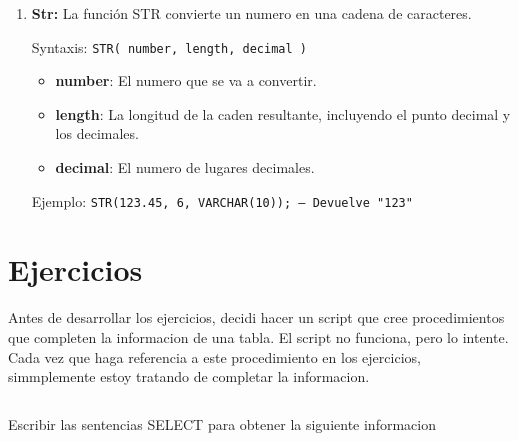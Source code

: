 \documentclass[a4paper,openany,11pt]{article}
\newcommand\skiplines[1]{\vspace{#1\baselineskip}}
\begin{document}
\begin{enumerate}
    \skiplines{1}
    \item \textbf{Str:}
        La función STR convierte un numero en una cadena de caracteres.

        Syntaxis: \texttt{STR( number, length, decimal )}
        \begin{itemize}
            \item \textbf{number}: El numero que se va a convertir.
            \item \textbf{length}: La longitud de la caden resultante,
                incluyendo el punto decimal y los decimales.
            \item \textbf{decimal}: El numero de lugares decimales.
        \end{itemize}

        Ejemplo: \texttt{STR(123.45, 6, VARCHAR(10)); -- Devuelve "123"}
\end{enumerate}

\section[5.2]{Ejercicios}
Antes de desarrollar los ejercicios, decidi hacer un script que cree
procedimientos que completen la informacion de una tabla. El script no
funciona, pero lo intente. Cada vez que haga referencia a este procedimiento en
los ejercicios, simmplemente estoy tratando de completar la informacion.

\inputminted[breaklines]{sql}{./code/proc.sql}

Escribir las sentencias SELECT para obtener la siguiente informacion


\end{document}
